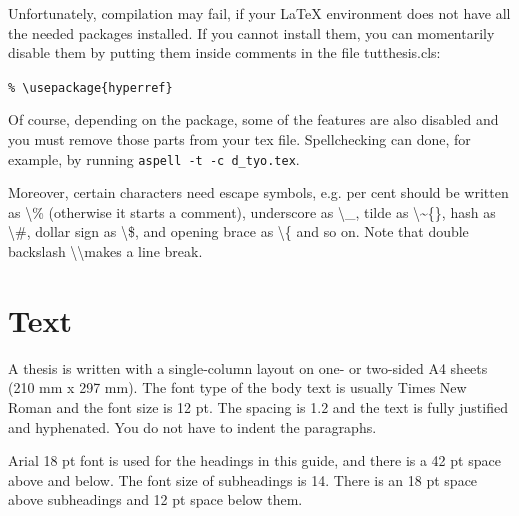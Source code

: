 \documentclass[12pt,a4paper,finnish]{tutthesis}
\begin{document}
Unfortunately, compilation may fail, if your LaTeX environment does
not have all the needed packages installed. If you cannot install
them, you can momentarily disable them by putting them inside comments
in the file tutthesis.cls:
\begin{center}
\texttt{\% \textbackslash usepackage\{hyperref\}}
\end{center}
Of course, depending on the package, some of the features are also
disabled and you must remove those parts from your tex file.
Spellchecking can done, for example, by running 
\texttt{aspell -t -c d\_tyo.tex}.

Moreover, certain characters need escape symbols, e.g. per cent should
be written as \textbackslash\% (otherwise it starts a comment),
underscore as \textbackslash\_, tilde as \textbackslash\~{}\{\}, hash
as \textbackslash\#, dollar sign as \textbackslash\$, and opening
brace as \textbackslash\{ and so on. Note that double backslash
\textbackslash\textbackslash makes a line break.

\section{Text}
A thesis is written with a single-column layout on one- or two-sided
A4 sheets (210 mm x 297 mm). The font type of the body text is usually
Times New Roman and the font size is 12 pt. The spacing is 1.2 and the
text is fully justified and hyphenated. You do not have to indent the
paragraphs.

Arial 18 pt font is used for the headings in this guide, and there is
a 42 pt space above and below. The font size of subheadings is
14. There is an 18 pt space above subheadings and 12 pt space below
them.
\end{document}
